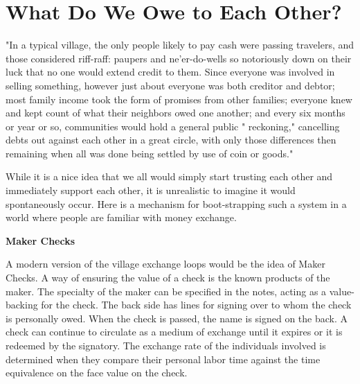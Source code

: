 	{\section{What Do We Owe to Each Other?}}



\begin{minipage}[t]{2.7in}
	\vspace{0pt}
	"In a typical village, the only people likely to pay cash were passing
	travelers, and those considered riff-raff: paupers and ne'er-do-wells so
	notoriously down on their luck that no one would extend credit to
	them. Since everyone was involved in selling something, however just
	about everyone was both creditor and debtor; most family income took
	the form of promises from other families; everyone knew and kept
	count of what their neighbors owed one another; and every six months
	or year or so, communities would hold a general public " reckoning,"
	cancelling debts out against each other in a great circle, with only those
	differences then remaining when all was done being settled by use of
	coin or goods." \footnotemark
	
	\vspace{0.2cm}
	
	While it is a nice idea that we all would simply start trusting each other and immediately support each other, it is unrealistic to imagine it would spontaneously occur. Here is a mechanism for boot-strapping such a system in a world where people are familiar with money exchange. 
	
		\vspace{0.2cm}
		
	{\centering \textbf{Maker Checks}\par}
	
		\vspace{0.2cm}
	A modern version of the village exchange loops would be the idea of Maker Checks. A way of ensuring the value of a check is the known products of the maker. The specialty of the maker can be specified in the notes, acting as a value-backing for the check. The back side has lines for signing over to whom the check is personally owed. When the check is passed, the name is signed on the back. A check can continue to circulate as a medium of exchange until it expires or it is redeemed by the signatory. The exchange rate of the individuals involved is determined when they compare their personal labor time against the time equivalence on the face value on the check.
	
	\vspace{0.2cm}
	

\end{minipage}
